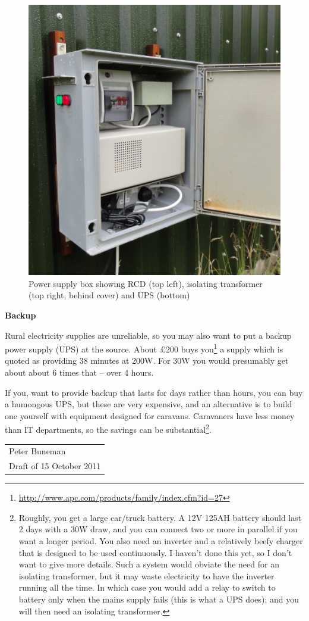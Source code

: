 \documentclass{article}
\begin{document}
\begin{figure}
\centerline{\includegraphics[scale = 0.15,bb= 200 0 1000 1200]{powerbox.jpg}}
\caption{Power supply box showing RCD (top left), isolating
  transformer (top right, behind cover) and UPS (bottom)}
\end{figure}
{\bf Backup}

Rural electricity supplies are unreliable, so you may also want to put
a backup power supply (UPS) at the source.  About \pounds200 buys
you\footnote{\url{http://www.apc.com/products/family/index.cfm?id=27}}
a supply which is quoted as providing 38 minutes at 200W.  For 30W you would
presumably get about about 6 times that -- over 4 hours.  

If you, want to provide backup that lasts for days rather than hours,
you can buy a humongous UPS, but these are very expensive, and an
alternative is to build one yourself with equipment designed for
caravans.  Caravaners have less money than IT departments, so the
savings can be substantial\footnote{Roughly, you get a large car/truck battery.  A 12V 125AH battery
should last 2 days with a 30W draw, and you can connect two or more in
parallel if you want a longer period.  You also need an inverter and a
relatively beefy charger that is designed to be used continuously.  I
haven't done this yet, so I don't want to give more details.  Such
a system would obviate the need for an isolating transformer,
but it may waste electricity to have the inverter running
all the time. In which case you would add a relay to switch to battery
only when the mains supply fails (this is what a UPS does); and you will then need an isolating
transformer.}.

\hfill\begin{tabular}{l}Peter Buneman\\Draft of 15 October 2011
\end{tabular}
\end{document}
